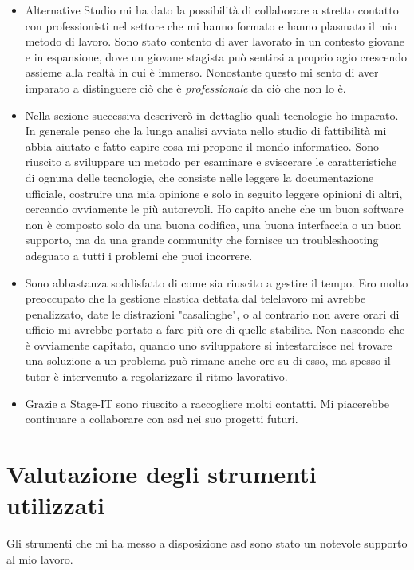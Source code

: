 \begin{itemize}
    \item Alternative Studio mi ha dato la possibilità di collaborare a stretto contatto con professionisti nel settore che mi hanno formato
    e hanno plasmato il mio metodo di lavoro. Sono stato contento di aver lavorato in un contesto giovane e in espansione, dove un giovane
    stagista può sentirsi a proprio agio crescendo assieme alla realtà in cui è immerso. Nonostante questo mi sento di aver imparato a
    distinguere ciò che è \textit{professionale} da ciò che non lo è.
    \item Nella sezione successiva descriverò in dettaglio quali tecnologie ho imparato. In generale penso che la lunga analisi avviata
    nello studio di fattibilità mi abbia aiutato e fatto capire cosa mi propone il mondo informatico. Sono riuscito a sviluppare un metodo
    per esaminare e sviscerare le caratteristiche di ognuna delle tecnologie, che consiste nelle leggere la documentazione ufficiale,
    costruire una mia opinione e solo in seguito leggere opinioni di altri, cercando ovviamente le più autorevoli. Ho capito anche che un
    buon software non è composto solo da una buona codifica, una buona interfaccia o un buon supporto, ma da una grande community che
    fornisce un troubleshooting adeguato a tutti i problemi che puoi incorrere.
    \item Sono abbastanza soddisfatto di come sia riuscito a gestire il tempo. Ero molto preoccupato che la gestione elastica dettata dal
    telelavoro mi avrebbe penalizzato, date le distrazioni "casalinghe", o al contrario non avere orari di ufficio mi avrebbe portato a fare
    più ore di quelle stabilite. Non nascondo che è ovviamente capitato, quando uno sviluppatore si intestardisce nel trovare una
    soluzione a un problema può rimane anche ore su di esso, ma spesso il tutor è intervenuto a regolarizzare il ritmo lavorativo. 
    \item Grazie a Stage-IT sono riuscito a raccogliere molti contatti. Mi piacerebbe continuare a collaborare con \acrlong{asd} nei suo
    progetti futuri.
\end{itemize}

\section{Valutazione degli strumenti utilizzati}

Gli strumenti che mi ha messo a disposizione \acrlong{asd} sono stato un notevole supporto al mio lavoro.

